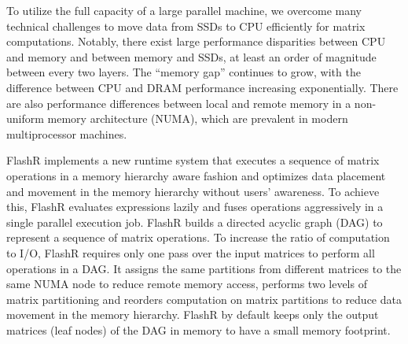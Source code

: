 
To utilize the full capacity of a large parallel machine, we overcome
many technical challenges to move data from SSDs to CPU efficiently for matrix
computations. Notably, there exist large performance disparities between CPU
and memory and between memory and SSDs, at least an order of magnitude between
every two layers. The ``memory gap'' \cite{Wilkes01} continues to grow, with
the difference between CPU and DRAM performance increasing exponentially.
There are also performance differences between
local and remote memory in a non-uniform memory architecture (NUMA), which are prevalent
in modern multiprocessor machines.


FlashR implements a new runtime system that executes a sequence of matrix
operations in a memory hierarchy aware fashion and optimizes
data placement and movement in the memory hierarchy without users' awareness.
To achieve this, FlashR evaluates expressions lazily and fuses operations
aggressively in a single parallel execution job. FlashR
builds a directed acyclic graph (DAG) to represent a sequence of matrix
operations. To increase the ratio of computation to I/O, FlashR requires
only one pass over the input matrices to perform all operations in a DAG.
It assigns the same partitions from different matrices to the same NUMA node
to reduce remote memory access, performs two levels of matrix partitioning
and reorders computation on matrix partitions to reduce data movement
in the memory hierarchy. FlashR by default keeps only the output
matrices (leaf nodes) of the DAG in memory to have a small memory footprint.


